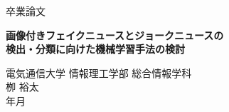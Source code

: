 
\frontmatter
\begin{titlepage}
  \vspace*{7mm}
  \begin{center}
    \Large{卒業論文}\\
    \vspace{40truemm}

    \LARGE{\textbf{画像付きフェイクニュースとジョークニュースの\\検出・分類に向けた機械学習手法の検討}}\\

    \vspace{30truemm}

    \Large{電気通信大学 情報理工学部 総合情報学科}\\

    \vspace{15truemm}
    \LARGE{栁 裕太} \vspace{5truemm} \\
    \large{\the\year 年\the\month 月} \\
  \end{center}
\end{titlepage}